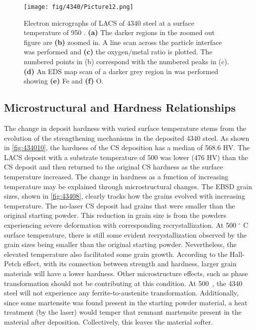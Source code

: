 \begin{figure}
	\centering
	\texttt{[image: fig/4340/Picture12.png]}
	\caption[Electron micrographs of LACS of 4340 steel at a surface temperature of 950 \celsius{}.]{Electron micrographs of LACS of 4340 steel at a surface temperature of 950 \celsius{}. \textbf{(a)} The darker regions in the zoomed out figure are \textbf{(b) }zoomed in. A line scan across the particle interface was performed and \textbf{(c)} the oxygen/metal ratio is plotted. The numbered points in (b) correspond with the numbered peaks in (c). \textbf{(d)} An EDS map scan of a darker grey region in was performed showing \textbf{(e)} Fe and \textbf{(f)} O.}
	\label{fig:434012}
\end{figure}


\subsection*{Microstructural and Hardness Relationships}

The change in deposit hardness with varied surface temperature stems from the evolution of the strengthening mechanisms in the deposited 4340 steel. As shown in \ref{fig:434010}, the hardness of the CS deposition has a median of 568.6 HV. The LACS deposit with a substrate temperature of 500 \celsius{} was lower (476 HV) than the CS deposit and then returned to the original CS hardness as the surface temperature increased. The change in hardness as a function of increasing temperature may be explained through microstructural changes. The EBSD grain sizes, shown in \ref{fig:43408}, clearly tracks how the grains evolved with increasing temperature. The no-laser CS deposit had grains that were smaller than the original starting powder. This reduction in grain size is from the powders experiencing severe deformation with corresponding recrystallization. At 500 $ ^{\circ} $ C surface temperature, there is still some evident recrystallization observed by the grain sizes being smaller than the original starting powder. Nevertheless, the elevated temperature also facilitated some grain growth. According to the Hall-Petch effect, with its connection between strength and hardness, larger grain materials will have a lower hardness. Other microstructure effects, such as phase transformation should not be contributing at this condition. At 500 \celsius{}, the 4340 steel will not experience any ferrite-to-austenite transformation. Additionally, since some martensite was found present in the starting powder material, a heat treatment (by the laser) would temper that remnant martensite present in the material after deposition. Collectively, this leaves the material softer. 


